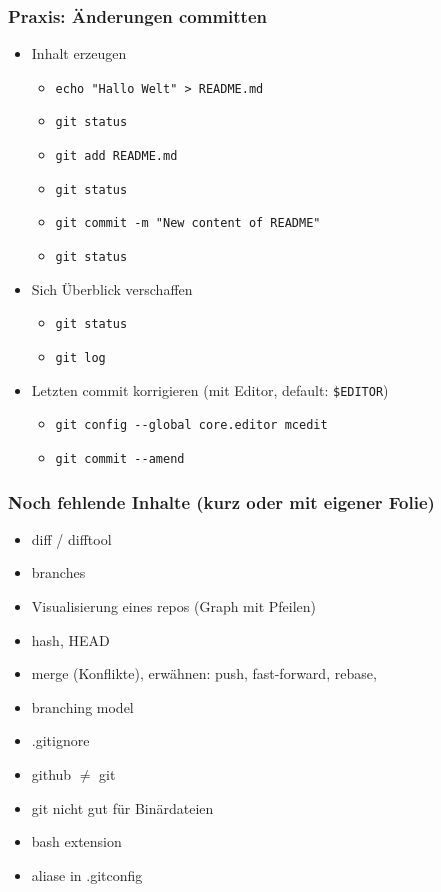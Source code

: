 \documentclass{beamer}
\begin{document}
\begin{frame}[label=gitintro40]
\frametitle{Praxis: Änderungen committen}
\begin{itemize}
 \item Inhalt erzeugen
\begin{itemize}
 \item \texttt{echo "{}Hallo Welt"{} > README.md}
 \item \texttt{git status}
 \item \texttt{git add README.md} \qquad {}
 \item \texttt{git status}
 \item \texttt{git commit -m "{}New content of README"{}}
 \item \texttt{git status}
\end{itemize}
 \bigskip
 \pause
 \item Sich Überblick verschaffen
 \begin{itemize}
 \item \texttt{git status}
 \item \texttt{git log}
 \end{itemize}
 \pause 
 \item Letzten commit korrigieren (mit Editor, default: \texttt{\$EDITOR})
 \begin{itemize}
 \item  \texttt{git config -{}-global core.editor mcedit}
 \item \texttt{git commit -{}-amend}
 \end{itemize}
\end{itemize}
 
\end{frame}


\begin{frame}[label=gitintro50]
\frametitle{Noch fehlende Inhalte (kurz oder mit eigener Folie)}
\begin{itemize}
\item diff / difftool
\item branches
\item Visualisierung eines repos (Graph mit Pfeilen)
\item hash, HEAD
\item merge (Konflikte),  erwähnen: push, fast-forward, rebase, 
\item branching model
\item .gitignore
\item github $\neq$ git
\item git nicht gut für Binärdateien
\item bash extension
\item aliase in .gitconfig

\end{itemize}
\end{frame}
\end{document}
